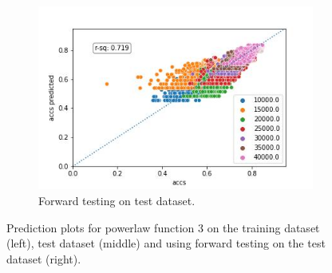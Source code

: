 \documentclass{article} %
\begin{document}
\begin{figure}
    \begin{subfigure}{.33\textwidth}
        \centering
        \includegraphics[width=.8\linewidth]{cifar10/powerlaw_all_epochs_accs_hat_total_n_arctan_epoch_arctan_val_forward_testing.jpg}
        \caption{Forward testing on test dataset.}
        \label{fig:powerlaw_acc_total_n_arctan_epoch_arctan_forward_val}
    \end{subfigure}
    \caption{Prediction plots for powerlaw function 3 on the training dataset (left), test dataset (middle) and using forward testing on the test dataset (right).}
    \label{fig:powerlaw_prediction_plot_fct_3}
\end{figure}
\end{document}
